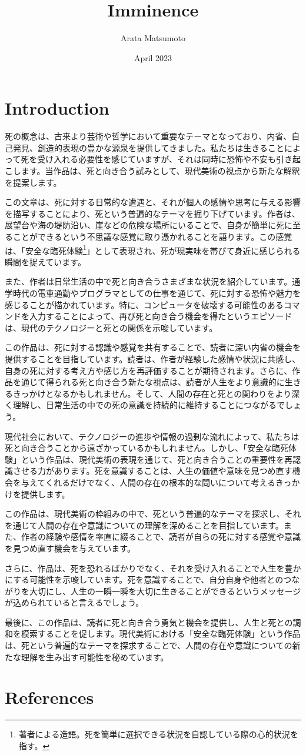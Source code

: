 \documentclass[a4paper]{article}
\title{Imminence}
\author{Arata Matsumoto}
\date{April 2023}
\begin{document}
\maketitle
\section{Introduction}
  死の概念は、古来より芸術や哲学において重要なテーマとなっており、内省、自己発見、創造的表現の豊かな源泉を提供してきました。私たちは生きることによって死を受け入れる必要性を感じていますが、それは同時に恐怖や不安も引き起こします。当作品は、死と向き合う試みとして、現代美術の視点から新たな解釈を提案します。

  この文章は、死に対する日常的な遭遇と、それが個人の感情や思考に与える影響を描写することにより、死という普遍的なテーマを掘り下げています。作者は、展望台や海の堤防沿い、崖などの危険な場所にいることで、自身が簡単に死に至ることができるという不思議な感覚に取り憑かれることを語ります。この感覚は、「安全な臨死体験\footnote{著者による造語。死を簡単に選択できる状況を自認している際の心的状況を指す。}」として表現され、死が現実味を帯びて身近に感じられる瞬間を捉えています。

  また、作者は日常生活の中で死と向き合うさまざまな状況を紹介しています。通学時代の電車通勤やプログラマとしての仕事を通じて、死に対する恐怖や魅力を感じることが描かれています。特に、コンピュータを破壊する可能性のあるコマンドを入力することによって、再び死と向き合う機会を得たというエピソードは、現代のテクノロジーと死との関係を示唆しています。

  この作品は、死に対する認識や感覚を共有することで、読者に深い内省の機会を提供することを目指しています。読者は、作者が経験した感情や状況に共感し、自身の死に対する考え方や感じ方を再評価することが期待されます。さらに、作品を通じて得られる死と向き合う新たな視点は、読者が人生をより意識的に生きるきっかけとなるかもしれません。そして、人間の存在と死との関わりをより深く理解し、日常生活の中での死の意識を持続的に維持することにつながるでしょう。

  現代社会において、テクノロジーの進歩や情報の過剰な流れによって、私たちは死と向き合うことから遠ざかっているかもしれません。しかし、「安全な臨死体験」という作品は、現代美術の表現を通じて、死と向き合うことの重要性を再認識させる力があります。死を意識することは、人生の価値や意味を見つめ直す機会を与えてくれるだけでなく、人間の存在の根本的な問いについて考えるきっかけを提供します。

  この作品は、現代美術の枠組みの中で、死という普遍的なテーマを探求し、それを通じて人間の存在や意識についての理解を深めることを目指しています。また、作者の経験や感情を率直に綴ることで、読者が自らの死に対する感覚や意識を見つめ直す機会を与えています。

  さらに、作品は、死を恐れるばかりでなく、それを受け入れることで人生を豊かにする可能性を示唆しています。死を意識することで、自分自身や他者とのつながりを大切にし、人生の一瞬一瞬を大切に生きることができるというメッセージが込められていると言えるでしょう。

  最後に、この作品は、読者に死と向き合う勇気と機会を提供し、人生と死との調和を模索することを促します。現代美術における「安全な臨死体験」という作品は、死という普遍的なテーマを探求することで、人間の存在や意識についての新たな理解を生み出す可能性を秘めています。

\section{References}
\end{document}
